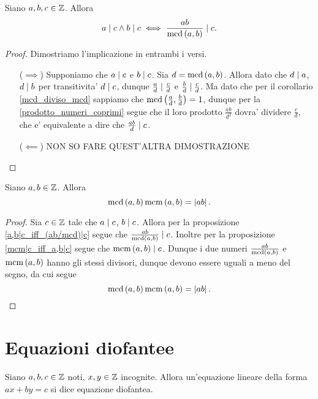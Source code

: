 \begin{proposition}\label{a,b|c_iff_(ab/mcd)|c}
    Siano $a, b, c \in \mathbb{Z}$. Allora \begin{equation}
        a \mid c \land b \mid c \iff \frac{ab}{\operatorname{mcd}\left(a, b\right)} \mid c.
    \end{equation}
\end{proposition}
\begin{proof}
    Dimostriamo l'implicazione in entrambi i versi.
    \begin{itemize}
        \item[($\implies$)] Supponiamo che $a \mid c$ e $b \mid c$. Sia $d = \operatorname{mcd}\left(a, b\right)$. Allora dato che $d \mid a$, $d \mid b$ per transitivita' $d \mid c$, dunque $\frac{a}{d} \mid \frac{c}{d}$ e $\frac{b}{d} \mid \frac{c}{d}$. Ma dato che per il corollario \ref{mcd_diviso_mcd} sappiamo che $\operatorname{mcd}\left(\frac{a}{d}, \frac{b}{d}\right) = 1$, dunque per la \ref{prodotto_numeri_coprimi} segue che il loro prodotto $\frac{ab}{d^2}$ dovra' dividere $\frac{c}{d}$, che e' equivalente a dire che $\frac{ab}{d} \mid c$.
        \item[($\impliedby$)] NON SO FARE QUEST'ALTRA DIMOSTRAZIONE \qedhere
    \end{itemize}
\end{proof}

\begin{proposition}
    \label{mcm*mcd=ab}
    Siano $a, b \in \mathbb{Z}$. Allora
    \begin{equation}
        \operatorname{mcd}\left(a, b\right)\operatorname{mcm}\left(a, b\right) = \left|ab\right|.
    \end{equation}
\end{proposition}
\begin{proof}
    Sia $c \in \mathbb{Z}$ tale che $a \mid c$, $b \mid c$. Allora per la proposizione \ref{a,b|c_iff_(ab/mcd)|c} segue che $\frac{ab}{\operatorname{mcd}\left(a, b\right)} \mid c$. Inoltre per la proposizione \ref{mcm|c_iff_a,b|c} segue che $\operatorname{mcm}\left(a, b\right) \mid c$.
    Dunque i due numeri $\frac{ab}{\operatorname{mcd}\left(a, b\right)}$ e $\operatorname{mcm}\left(a, b\right)$ hanno gli stessi divisori, dunque devono essere uguali a meno del segno, da cui segue \[
        \operatorname{mcd}\left(a, b\right)\operatorname{mcm}\left(a, b\right) = \left|ab\right|. 
    \]
\end{proof}

\section{Equazioni diofantee}

\begin{definition}
    Siano $a, b, c \in \mathbb{Z}$ noti, $x, y \in \mathbb{Z}$ incognite. Allora un'equazione lineare della forma $ax + by = c$ si dice equazione diofantea.
\end{definition}

